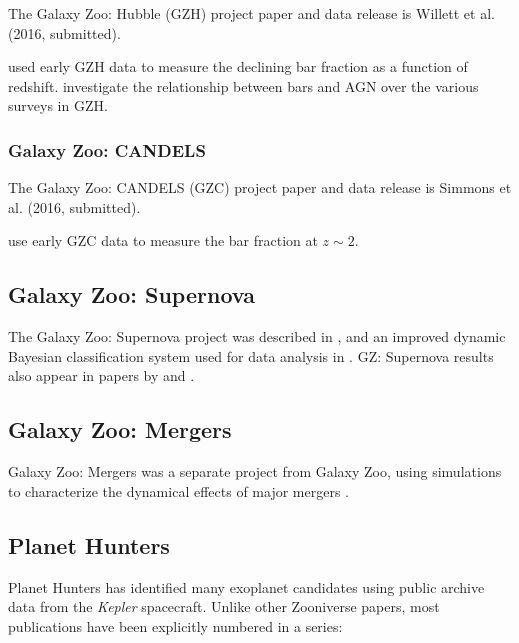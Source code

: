 \documentclass[twocolumn]{aastex6}
\begin{document}
The Galaxy Zoo: Hubble (GZH) project paper and data release is Willett et al. (2016, submitted).

\citet{mel14} used early GZH data to measure the declining bar fraction as a function of redshift. \citet{che15} investigate the relationship between bars and AGN over the various surveys in GZH.

\subsubsection{Galaxy Zoo: CANDELS}

The Galaxy Zoo: CANDELS (GZC) project paper and data release is Simmons et al. (2016, submitted).

\citet{sim14} use early GZC data to measure the bar fraction at $z\sim2$.

\subsection{Galaxy Zoo: Supernova}

The Galaxy Zoo: Supernova project was described in \citet{smi11}, and an improved dynamic Bayesian classification system used for data analysis in \citet{sim13a}. GZ: Supernova results also appear in papers by \citet{mag11,mag12a} and \citet{lev13}. 

\subsection{Galaxy Zoo: Mergers}

Galaxy Zoo: Mergers was a separate project from Galaxy Zoo, using simulations to characterize the dynamical effects of major mergers \citep{hol16}.

\subsection{Planet Hunters}

Planet Hunters has identified many exoplanet candidates using public archive data from the {\it Kepler} spacecraft. Unlike other Zooniverse papers, most publications have been explicitly numbered in a series:
\end{document}

